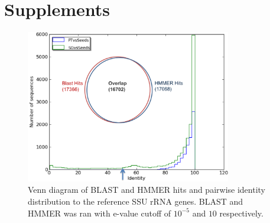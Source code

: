 \documentclass[12pt]{article}
\begin{document}



\section{Supplements}

    \begin{figure}[tbph!]
    \centering
    \includegraphics[width=0.8\textwidth]{figs/vennPlusIdenDisWholeLength}
    \caption[Venn diagram of BLAST and HMMER hits and pairwise identity distribution to the reference SSU rRNA genes]{Venn diagram of BLAST and HMMER hits and pairwise identity distribution to the reference SSU rRNA genes. BLAST and HMMER was ran with e-value cutoff of $10^{-5}$ and $10$ respectively.}
    \label{fig:vennPlusIdenDisWholeLength}
    \end{figure}
\end{document}
